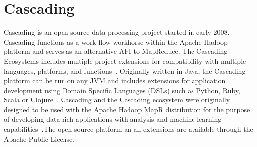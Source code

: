 \section{Cascading}

Cascading is an open source data processing project started in early
2008. Cascading functions as a work flow workhorse within the Apache
Hadoop platform and serves as an alternative API to MapReduce. The
Cascading Ecosystems includes multiple project extensions for
compatibility with multiple languages, platforms, and
functions~\cite{hid-sp18-507-CascadingEco}. Originally written in
Java, the Cascading platform can be run on any JVM and includes
extensions for application development using Domain Specific Languages
(DSLs) such as Python, Ruby, Scala or
Clojure~\cite{hid-sp18-507-GitHubCascading}. Cascading and the
Cascading ecosystem were originally designed to be used with the
Apache Hadoop MapR distribution for the purpose of developing
data-rich applications with analysis and machine learning
capabilities~\cite{hid-sp18-507-MapR}.The open source platform an all
extensions are available through the Apache Public License.
